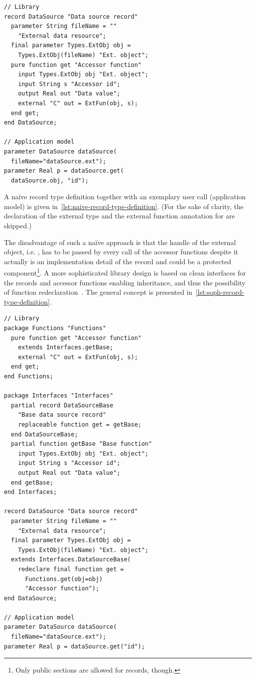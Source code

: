 \documentclass{modelica}
\newcommand{\modelica}[1]{\code{#1}}
\begin{document}
\begin{lstlisting}[caption=Na\"ive record type definition, label=lst:naive-record-type-definition, language=modelica]
// Library
record DataSource "Data source record"
  parameter String fileName = ""
    "External data resource";
  final parameter Types.ExtObj obj =
    Types.ExtObj(fileName) "Ext. object";
  pure function get "Accessor function"
    input Types.ExtObj obj "Ext. object";
    input String s "Accessor id";
    output Real out "Data value";
    external "C" out = ExtFun(obj, s);
  end get;
end DataSource;

// Application model
parameter DataSource dataSource(
  fileName="dataSource.ext");
parameter Real p = dataSource.get(
  dataSource.obj, "id");
\end{lstlisting}

A na\"ive record type definition together with an exemplary user call (application model) is given in~\autoref{lst:naive-record-type-definition}.
(For the sake of clarity, the declaration of the external type \modelica{Types.ExtObj} and the external function annotation for \modelica{ExtFun} are skipped.)

The disadvantage of such a na\"ive approach is that the handle of the external object, i.e. \modelica{dataSource.obj}, has to be passed by every call of the accessor functions despite it actually is an implementation detail of the record and could be a protected component\footnote{Only public sections are allowed for records, though.}.
A more sophisticated library design is based on clean interfaces for the records and accessor functions enabling inheritance, and thus the possibility of function redeclaration~\cite{modelisax2018hints}.
The general concept is presented in~\autoref{lst:soph-record-type-definition}.

\begin{lstlisting}[caption=Sophisticated record type definition, label=lst:soph-record-type-definition, language=modelica]
// Library
package Functions "Functions"
  pure function get "Accessor function"
    extends Interfaces.getBase;
    external "C" out = ExtFun(obj, s);
  end get;
end Functions;

package Interfaces "Interfaces"
  partial record DataSourceBase
    "Base data source record"
    replaceable function get = getBase;
  end DataSourceBase;
  partial function getBase "Base function"
    input Types.ExtObj obj "Ext. object";
    input String s "Accessor id";
    output Real out "Data value";
  end getBase;
end Interfaces;

record DataSource "Data source record"
  parameter String fileName = ""
    "External data resource";
  final parameter Types.ExtObj obj =
    Types.ExtObj(fileName) "Ext. object";
  extends Interfaces.DataSourceBase(
    redeclare final function get =
      Functions.get(obj=obj)
      "Accessor function");
end DataSource;

// Application model
parameter DataSource dataSource(
  fileName="dataSource.ext");
parameter Real p = dataSource.get("id");
\end{lstlisting}
\end{document}
